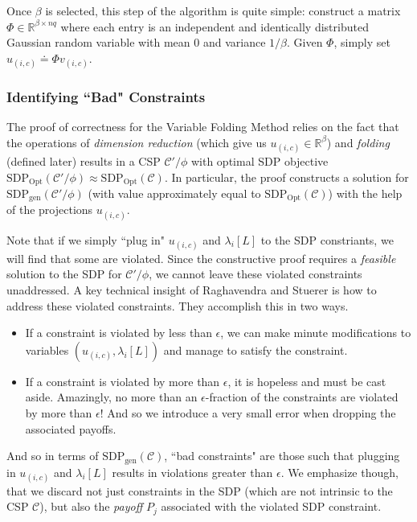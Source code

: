 \documentclass[letterpaper, 12pt]{article}
\numberwithin{equation}{section}
\begin{document}
Once $\beta$ is selected, this step of the algorithm is quite simple: construct a matrix $\Phi \in \mathbb{R}^{\beta \times nq}$ where each entry is an independent and identically distributed Gaussian random variable with mean 0 and variance $1/\beta$. Given $\Phi$, simply set $u_{(i,c)} \doteq \Phi v_{(i,c)}$.

\subsubsection{Identifying ``Bad" Constraints}
The proof of correctness for the Variable Folding Method relies on the fact that the operations of \textit{dimension reduction} (which give us $u_{(i,c)} \in \mathbb{R}^{\beta}$) and \textit{folding} (defined later) results in a CSP $\mathcal{C}'/\phi$ with optimal SDP objective $\text{SDP}_{\text{Opt}}(\mathcal{C}'/\phi) \approx \text{SDP}_{\text{Opt}}(\mathcal{C})$. In particular, the proof constructs a solution for $\text{SDP}_{\text{gen}}(\mathcal{C}'/\phi)$ (with value approximately equal to $ \text{SDP}_{\text{Opt}}(\mathcal{C})$) with the help of the projections $u_{(i,c)}$. 

Note that if we simply ``plug in" $u_{(i,c)}$ and $\lambda_i[L]$ to the SDP constriants, we will find that some are violated. Since the constructive proof requires a \textit{feasible} solution to the SDP for $\mathcal{C}'/\phi$, we cannot leave these violated constraints unaddressed. A key technical insight of Raghavendra and Stuerer is how to address these violated constraints. They accomplish this in two ways.

\begin{itemize}
\item If a constraint is violated by less than $\epsilon$, we can make minute modifications to variables $(u_{(i,c)},\lambda_i[L])$ and manage to satisfy the constraint.
\item If a constraint is violated by more than $\epsilon$, it is hopeless and must be cast aside. Amazingly, no more than an $\epsilon$-fraction of the constraints are violated by more than $\epsilon$! And so we introduce a very small error when dropping the associated payoffs.
\end{itemize}

And so in terms of $\text{SDP}_{\text{gen}}(\mathcal{C})$, ``bad constraints" are those such that plugging in $u_{(i,c)}$ and $\lambda_i[L]$ results in violations greater than $\epsilon$. We emphasize though, that we discard not just constraints in the SDP (which are not intrinsic to the CSP $\mathcal{C}$), but also the \textit{payoff} $P_j$ associated with the violated SDP constraint. 
\end{document}
